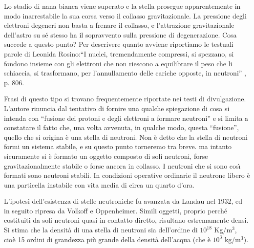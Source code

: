 \par
Lo stadio di nana bianca viene superato e la stella prosegue apparentemente in modo inarrestabile la sua corsa verso il collasso gravitazionale. La pressione degli elettroni degeneri non basta a frenare il collasso, e l'attrazione gravitazionale dell'astro su sé stesso ha il sopravvento sulla pressione di degenerazione. Cosa succede a questo punto?
Per descrivere quanto avviene riportiamo le testuali parole di Leonida Rosino:``I nuclei, tremendamente compressi, si spezzano, si fondono insieme con gli elettroni che non riescono a equilibrare il peso che li schiaccia, si trasformano, per l'annullamento delle cariche opposte, in neutroni'' \Cite{rosino}, p. 806.
\par
Frasi di questo tipo si trovano frequentemente riportate nei testi di divulgazione. L'autore rinuncia dal tentativo di fornire una qualche spiegazione di cosa si intenda con ``fusione dei protoni e degli elettroni a formare neutroni'' e si limita a constatare il fatto che, una volta avvenuta, in qualche modo, questa ``fusione'', quello che si origina è una stella di neutroni. Non è detto che la stella di neutroni formi un sistema stabile, e su questo punto torneremo tra breve. ma intanto sicuramente si è formato un oggetto composto di soli neutroni, forse gravitazionalmente stabile o forse ancora in collasso.
I neutroni che si sono cos\`{\i}{} formati sono neutroni stabili. In condizioni operative ordinarie il neutrone libero è una particella instabile con vita media di circa un quarto d'ora. 
\par
L'ipotesi dell'esistenza di stelle neutroniche fu avanzata da Landau nel 1932, ed in seguito ripresa da Volkoff e Oppenheimer. Simili oggetti, proprio perch\'{e} costituiti da soli neutroni quasi in contatto diretto, risultano estremamente densi. Si stima che la densit\`{a} di una stella di neutroni sia dell'ordine di $10^{18}$ Kg/m$^{3}$, cioè 15 ordini di grandezza più grande della densit\`{a} dell'acqua (che è $10^{3}$ kg/m$^{3}$).
